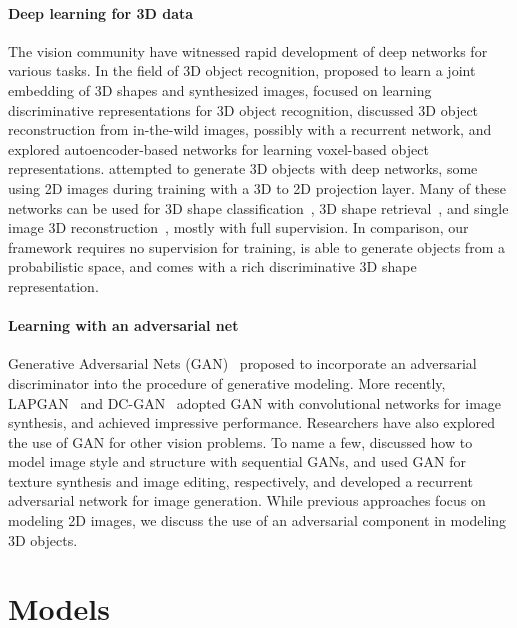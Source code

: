 \documentclass{article}
\newcommand{\myparagraph}[1]{\vspace{-10pt}\paragraph{#1}}
\newcommand{\presection}{\vspace{-8pt}}
\newcommand{\postsection}{\vspace{-8pt}}
\begin{document}
\myparagraph{Deep learning for 3D data} 
The vision community have witnessed rapid development of deep networks for various tasks. In the field of 3D object recognition, \cite{li2015joint,su15,girdhar2016learning} proposed to learn a joint embedding of 3D shapes and synthesized images, \cite{su2015multi,qi2016volumetric} focused on learning discriminative representations for 3D object recognition, \cite{wu2016single,xiang2015data,choy20163d} discussed 3D object reconstruction from in-the-wild images, possibly with a recurrent network, and \cite{girdhar2016learning,sharma2016vconv} explored autoencoder-based networks for learning voxel-based object representations. \cite{wu20153d,rezende2016unsupervised,yan2016projective} attempted to generate 3D objects with deep networks, some using 2D images during training with a 3D to 2D projection layer. Many of these networks can be used for 3D shape classification~\citep{su2015multi,sharma2016vconv,maturana2015voxnet}, 3D shape retrieval~\citep{shi2015deeppano,su2015multi}, and single image 3D reconstruction~\citep{kar2015category,bansal2016marr,girdhar2016learning}, mostly with full supervision. In comparison, our framework requires no supervision for training, is able to generate objects from a probabilistic space, and comes with a rich discriminative 3D shape representation.

\myparagraph{Learning with an adversarial net} Generative Adversarial Nets (GAN)~\citep{goodfellow2014generative} proposed to incorporate an adversarial discriminator into the procedure of generative modeling. More recently, LAPGAN~\citep{denton2015deep} and DC-GAN~\citep{radford2016unsupervised} adopted GAN with convolutional networks for image synthesis, and achieved impressive performance. Researchers have also explored the use of GAN for other vision problems. To name a few, \cite{wang2016generative} discussed how to model image style and structure with sequential GANs, \cite{li2016precomputed} and \cite{zhu2016generative} used GAN for texture synthesis and image editing, respectively, and \cite{im2016generating} developed a recurrent adversarial network for image generation. While previous approaches focus on modeling 2D images, we discuss the use of an adversarial component in modeling 3D objects.


\presection
\section{Models}
\label{sec:model}
\postsection
\end{document}
